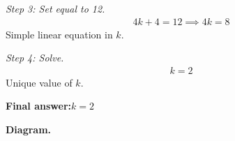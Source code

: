 \documentclass[11pt]{article}
\begin{document}
\textit{Step 3: Set equal to 12.}
\[\begin{gathered}
4k + 4 = 12 \implies 4k = 8
\end{gathered}\]
Simple linear equation in \( k \).

\textit{Step 4: Solve.}
\[\begin{gathered}
k = 2
\end{gathered}\]
Unique value of \( k \).

\begin{answerbox}
\textbf{Final answer:}\quad \(\displaystyle k = 2\)
\end{answerbox}
\textbf{Diagram.}

\begin{center}
\end{center}
\end{document}
